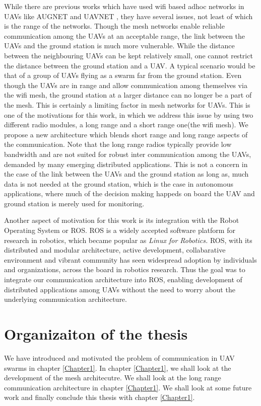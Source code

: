 While there are previous works which have used wifi based adhoc networks in UAVs like AUGNET \cite{augnet} and UAVNET \cite{uavnet}, they have several issues, not least of which is the range of the networks. Though the mesh networks enable reliable communication among the UAVs at an acceptable range, the link between the UAVs and the ground station is much more vulnerable. While the distance between the neighbouring UAVs can be kept relatively small, one cannot restrict the distance between the ground station and a UAV. A typical scenario would be that of a group of UAVs flying as a swarm far from the ground station. Even though the UAVs are in range and allow communication among themselves via the wifi mesh, the ground station at a larger distance can no longer be a part of the mesh. This is certainly a limiting factor in mesh networks for UAVs. This is one of the motivations for this work, in which we address this issue by using two different radio modules, a long range and a short range one(the wifi mesh). We propose a new architecture which blends short range and long range aspects of the communication. Note that the long range radios typically provide low bandwidth and are not suited for robust inter communication among the UAVs, demanded by many emerging distributed applications. This is not a concern in the case of the link between the UAVs and the ground station as long as, much data is not needed at the ground station, which is the case in autonomous applications, where much of the decision making happeds on board the UAV and ground station is merely used for monitoring.

Another aspect of motivation for this work is its integration with the Robot Operating System or ROS. ROS is a widely accepted software platform for research in robotics, which became popular as \textit{Linux for Robotics.} ROS, with its distributed and modular architecture, active development, collabarative environment and vibrant community has seen widespread adoption by individuals and organizations, across the board in robotics research. Thus the goal was to integrate our communication architecture into ROS, enabling development of distributed applications among UAVs without the need to worry about the underlying communication architecture.

\section{Organizaiton of the thesis}
We have introduced and motivated the problem of communication in UAV swarms in chapter \ref{Chapter1}. In chapter \ref{Chapter1}, we shall look at the development of the mesh architecutre. We shall look at the long range communication architecture in chapter \ref{Chapter1}. We shall look at some future work and  finally conclude this thesis with chapter \ref{Chapter1}.